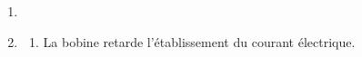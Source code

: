 \begin{enumerate}
    \item
    \item
          \begin{enumerate}
              \item La bobine retarde l'établissement du courant électrique.
          \end{enumerate}
\end{enumerate}

